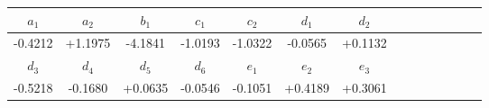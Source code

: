 \documentclass[twocolumn,showpacs,preprintnumbers,superscriptaddress,prb,floatfix,aps,10pt]{revtex4-1}
\begin{document}
\begin{widetext}
\begin{table}[h]
{\begin{tabular}{cccccccccccccc}
 $a_{1}$ & $a_{2}$ & $b_{1}$ & $c_{1}$ & $c_{2}$ & $d_{1}$ & $d_{2}$ \\ \hline\hline
 -0.4212 & +1.1975 & -4.1841 & -1.0193 & -1.0322 & -0.0565 & +0.1132 \\
 $d_{3}$ & $d_{4}$ & $d_{5}$ & $d_{6}$ & $e_{1}$ & $e_{2}$ & $e_{3}$ \\ \hline\hline
 -0.5218 & -0.1680 & +0.0635 & -0.0546 & -0.1051 & +0.4189 & +0.3061 \\ 
\end{tabular}
}
\end{table}








\end{widetext}
\end{document}
